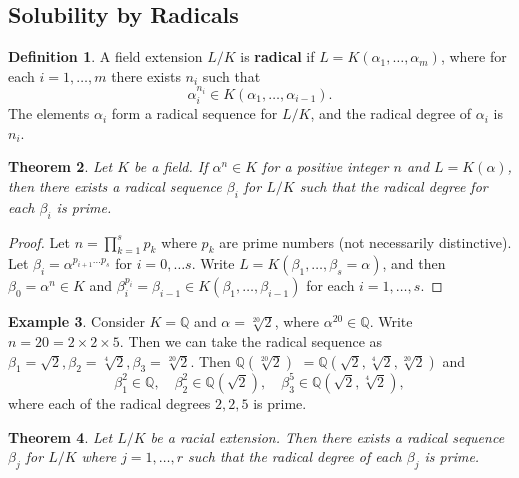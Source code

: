 \documentclass[12pt]{article}
\newtheorem{theorem}{Theorem}
\theoremstyle{definition}
\newtheorem{definition}[theorem]{Definition}
\newtheorem{example}[theorem]{Example}
\begin{document}
\subsection{Solubility by Radicals}
\begin{definition} \label{def:radical-extension}
    A field extension $L / K$ is \textbf{radical} if $L=K\left(\alpha_1, \ldots, \alpha_m\right)$, where for each $i=1, \ldots, m$ there exists $n_i$ such that
$$
\alpha_i^{n_i} \in K\left(\alpha_1, \ldots, \alpha_{i-1}\right).
$$
The elements $\alpha_i$ form a radical sequence for $L / K$, and the radical degree of $\alpha_i$ is $n_i$.
\end{definition}

\begin{theorem} \label{thm:radical-single-prime}
    Let $K$ be a field. If $\alpha ^ n \in K$ for a positive integer $n$ and  $L = K (\alpha)$, then there exists a radical sequence $\beta_i$ for $L / K$ such that the radical degree for each $\beta_i$ is prime.
\end{theorem}

\begin{proof}
    Let $n = \prod_{k=1}^{s} p_{k}$ where $p_{k}$ are prime numbers (not necessarily distinctive). Let $\beta_{i} = \alpha^ {p_{i + 1} \dots  p_{s}}$ for $i = 0, \dots s$. Write $L = K(\beta_1,  \dots, \beta_s = \alpha)$, and then $\beta_0 = \alpha^n \in K$ and  $\beta_i ^ {p_i} = \beta_{i-1} \in K(\beta_1, \dots, \beta_{i - 1})$ for each $i  = 1, \dots, s$. 
\end{proof}

\begin{example}
    Consider $K  = \mathbb Q$ and $\alpha = \sqrt[20]{2}$, where $\alpha ^ {20} \in \mathbb Q$. Write $n = 20 =  2 \times 2 \times 5 $. Then we can take the radical sequence as $\beta_1 = \sqrt 2, \beta_2 = \sqrt[4]{2}, \beta_3 = \sqrt[20]{2}$. Then $\mathbb Q(\sqrt[20]{2}) $ $= \mathbb Q(\sqrt{2}, \sqrt[4]{2}, \sqrt[20]{2})$ and 
    $$
    \beta_1 ^ 2 \in \mathbb Q, \quad \beta_2 ^ 2 \in \mathbb Q(\sqrt{2}), \quad \beta_3^5 \in \mathbb Q (\sqrt{2}, \sqrt[4]{2}),
    $$
    where each of the radical degrees $2, 2, 5$ is prime.
\end{example}

\begin{theorem} \label{thm:radical-all-prime}
    Let $L / K$ be a racial extension. Then there exists a radical sequence $\beta_j$ for $L / K$ where $j=1, \dots, r$ such that the radical degree of each $\beta_j$ is prime.
\end{theorem}
\end{document}
